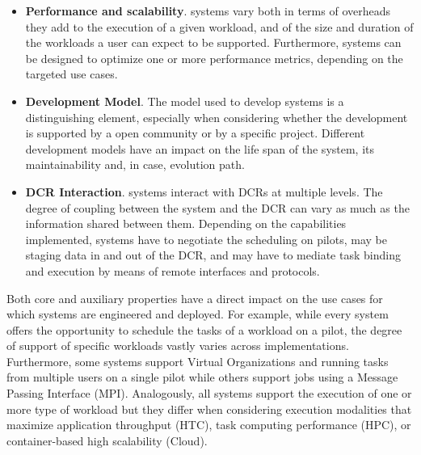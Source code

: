 \documentclass{sig-alternate}
\begin{document}
\begin{itemize}
\item \textbf{Performance and scalability}. \pilot systems vary both in
  terms of overheads they add to the execution of a given workload, and of the
  size and duration of the workloads a user can expect to be supported.
  Furthermore, \pilot systems can be designed to optimize one or more
  performance metrics, depending on the targeted use cases.

\item \textbf{Development Model}. The model used to develop \pilot systems is a
  distinguishing element, especially when considering whether the development
  is supported by a open community or by a specific project. Different
  development models have an impact on the life span of the \pilot system, its
  maintainability and, in case, evolution path.

\item \textbf{DCR Interaction}. \pilot systems interact with DCRs at multiple
  levels. The degree of coupling between the \pilot system and the DCR can vary
  as much as the information shared between them. Depending on the capabilities
  implemented, \pilot systems have to negotiate the scheduling on pilots, may be
  staging data in and out of the DCR, and may have to mediate task binding and
  execution by means of remote interfaces and protocols.

   

\end{itemize}

Both core and auxiliary properties have a direct impact on the use cases for
which \pilot systems are engineered and deployed. For example, while every
\pilot system offers the opportunity to schedule the tasks of a workload on a
pilot, the degree of support of specific workloads vastly varies across
implementations. Furthermore, some \pilot systems support Virtual Organizations
and running tasks from multiple users on a single pilot while others support
jobs using a Message Passing Interface (MPI). Analogously, all \pilot systems
support the execution of one or more type of workload but they differ when
considering execution modalities that maximize application throughput (HTC),
task computing performance (HPC), or container-based high scalability (Cloud).
\end{document}
